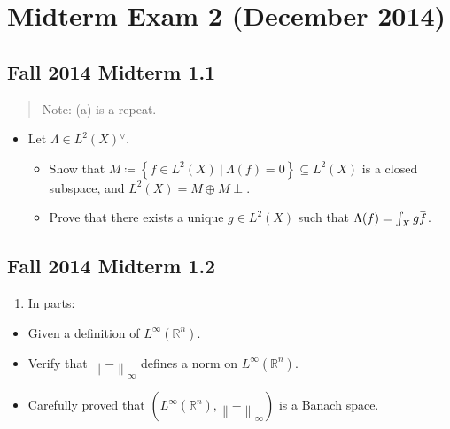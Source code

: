 \hypertarget{midterm-exam-2-december-2014}{%
\section{Midterm Exam 2 (December
2014)}\label{midterm-exam-2-december-2014}}

\hypertarget{fall-2014-midterm-1.1}{%
\subsection{Fall 2014 Midterm 1.1}\label{fall-2014-midterm-1.1}}

\begin{quote}
Note: (a) is a repeat.
\end{quote}

\begin{itemize}
\tightlist
\item
  Let \(\Lambda\in L^2(X) {}^{ \vee }\).

  \begin{itemize}
  \tightlist
  \item
    Show that
    \(M\coloneqq\left\{{f\in L^2(X) {~\mathrel{\Big\vert}~}\Lambda(f) = 0}\right\} \subseteq L^2(X)\)
    is a closed subspace, and \(L^2(X) = M \oplus M\perp\).
  \item
    Prove that there exists a unique \(g\in L^2(X)\) such that
    \(\Lambda(f) = \int_X g \mkern 1.5mu\overline{\mkern-1.5muf\mkern-1.5mu}\mkern 1.5mu\).
  \end{itemize}
\end{itemize}

\hypertarget{fall-2014-midterm-1.2}{%
\subsection{Fall 2014 Midterm 1.2}\label{fall-2014-midterm-1.2}}

\begin{enumerate}
\def\labelenumi{\alph{enumi}.}
\tightlist
\item
  In parts:
\end{enumerate}

\begin{itemize}
\tightlist
\item
  Given a definition of \(L^\infty({\mathbb{R}}^n)\).
\item
  Verify that \({\left\lVert {{-}} \right\rVert}_\infty\) defines a norm
  on \(L^\infty({\mathbb{R}}^n)\).
\item
  Carefully proved that
  \((L^\infty({\mathbb{R}}^n), {\left\lVert {{-}} \right\rVert}_\infty)\)
  is a Banach space.
\end{itemize}

